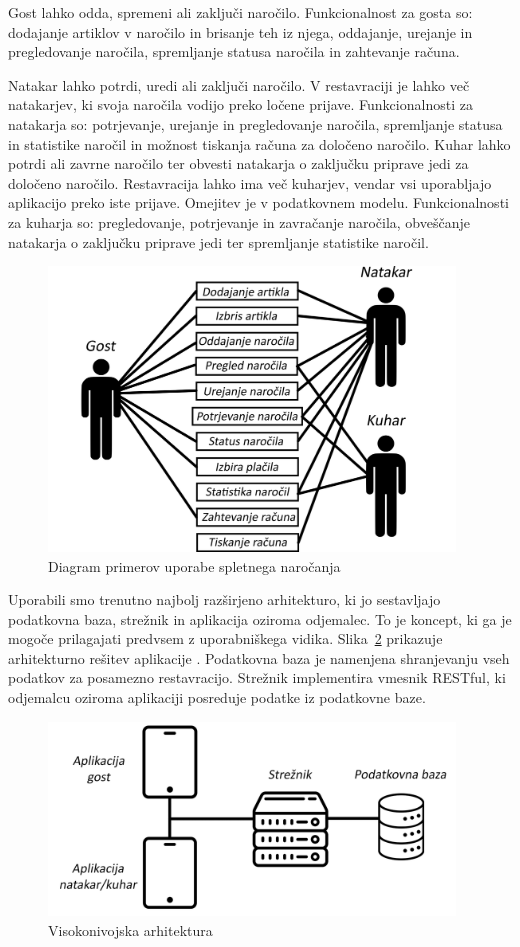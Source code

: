 \documentclass[a4paper, 12pt]{book}
\begin{document}
Gost lahko odda, spremeni ali zaključi naročilo. Funkcionalnost za gosta so: dodajanje artiklov v naročilo in brisanje teh iz njega, oddajanje, urejanje in pregledovanje naročila, spremljanje statusa naročila in zahtevanje računa. 

Natakar lahko potrdi, uredi ali zaključi naročilo. V restavraciji je lahko več natakarjev, ki svoja naročila vodijo preko ločene prijave. Funkcionalnosti za natakarja so: potrjevanje, urejanje in pregledovanje naročila, spremljanje statusa in statistike naročil in možnost tiskanja računa za določeno naročilo. Kuhar lahko potrdi ali zavrne naročilo ter obvesti natakarja o zaključku priprave jedi za določeno naročilo. Restavracija lahko ima več kuharjev, vendar vsi uporabljajo aplikacijo preko iste prijave. Omejitev je v podatkovnem modelu. Funkcionalnosti za kuharja so: pregledovanje, potrjevanje in zavračanje naročila, obveščanje natakarja o zaključku priprave jedi ter spremljanje statistike naročil. 

\begin{figure}[!htb]
\centering
\includegraphics[width=10.8cm]{Skica2.png}
\caption{Diagram primerov uporabe spletnega naročanja}
\label{FunkVloge}
\end{figure}

Uporabili smo trenutno najbolj razširjeno arhitekturo, ki jo sestavljajo podatkovna baza, strežnik in aplikacija oziroma odjemalec. To je koncept, ki ga je mogoče prilagajati predvsem z uporabniškega vidika. Slika~\ref{StrukApk} prikazuje arhitekturno rešitev aplikacije \cite{TRINIVO}.
Podatkovna baza je namenjena shranjevanju vseh podatkov za posamezno restavracijo. Strežnik implementira vmesnik RESTful, ki odjemalcu oziroma aplikaciji posreduje podatke iz podatkovne baze. 

\begin{figure}[!htb]
\centering
\includegraphics[width=10.8cm]{Skica1-new.png}
\caption{Visokonivojska arhitektura}
\label{StrukApk}
\end{figure}
\end{document}
